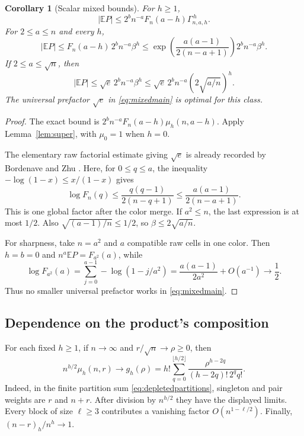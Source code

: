 \documentclass[11pt]{article}
\newtheorem{corollary}[theorem]{Corollary}
\theoremstyle{definition}
\theoremstyle{remark}
\newcommand{\E}{\mathbb E}
\newcommand{\1}{\mathbf 1}
\begin{document}
\begin{corollary}[Scalar mixed bounds]\label{cor:mixedscalar}
For $h\ge1$,
\begin{equation}\label{eq:mixedgamma}
|\E P|\le 2^b n^{-a}F_n(a-h)\Gamma_{n,a,h}^{\,h}.
\end{equation}
For $2\le a\le n$ and every $h$,
\begin{equation}\label{eq:mixedgeneral}
|\E P|\le F_n(a-h)\,2^b n^{-a}\beta^h
\le\exp\left(\frac{a(a-1)}{2(n-a+1)}\right)2^bn^{-a}\beta^h.
\end{equation}
If $2\le a\le\sqrt n$, then
\begin{equation}\label{eq:mixedmain}
|\E P|\le\sqrt e\,2^b n^{-a}\beta^h
\le\sqrt e\,2^b n^{-a}\left(2\sqrt{a/n}\right)^h.
\end{equation}
The universal prefactor $\sqrt e$ in \eqref{eq:mixedmain} is optimal for this class.
\end{corollary}
\begin{proof}
The exact bound is $2^bn^{-a}F_n(a-h)\mu_h(n,a-h)$. Apply Lemma~\ref{lem:super}, with $\mu_0=1$ when $h=0$.

The elementary raw factorial estimate giving $\sqrt e$ is already recorded by Bordenave and Zhu \cite[Lemma 2.1, equation (2.3)]{BZ}. Here, for $0\le q\le a$, the inequality $-\log(1-x)\le x/(1-x)$ gives
\[
\log F_n(q)\le\frac{q(q-1)}{2(n-q+1)}
\le\frac{a(a-1)}{2(n-a+1)}.
\]
This is one global factor after the color merge. If $a^2\le n$, the last expression is at most $1/2$. Also $\sqrt{(a-1)/n}\le1/2$, so $\beta\le2\sqrt{a/n}$.

For sharpness, take $n=a^2$ and $a$ compatible raw cells in one color. Then $h=b=0$ and $n^a\E P=F_{a^2}(a)$, while
\[
\log F_{a^2}(a)=
\sum_{j=0}^{a-1}-\log(1-j/a^2)
=\frac{a(a-1)}{2a^2}+O(a^{-1})\longrightarrow\frac12.
\]
Thus no smaller universal prefactor works in \eqref{eq:mixedmain}.
\end{proof}

\subsection{Dependence on the product's composition}

For each fixed $h\ge1$, if $n\to\infty$ and $r/\sqrt n\to\rho\ge0$, then
\begin{equation}\label{eq:mixedfixedh}
n^{h/2}\mu_h(n,r)\longrightarrow
g_h(\rho)=h!\sum_{q=0}^{\lfloor h/2\rfloor}
\frac{\rho^{h-2q}}{(h-2q)!\,2^q q!}.
\end{equation}
Indeed, in the finite partition sum \eqref{eq:depletedpartitions}, singleton and pair weights are $r$ and $n+r$. After division by $n^{h/2}$ they have the displayed limits. Every block of size $\ell\ge3$ contributes a vanishing factor $O(n^{1-\ell/2})$. Finally, $(n-r)_h/n^h\to1$.
\end{document}
